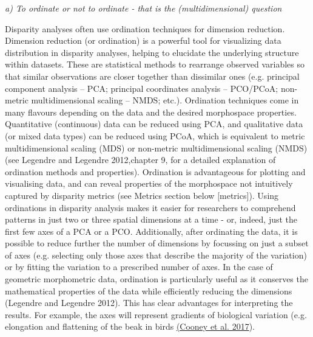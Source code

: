 \documentclass[12pt,letterpaper]{article}
\renewcommand{\subsection}[1]{%
\bigskip
\begin{center}
\begin{large}
\normalfont\itshape #1
\end{large}
\end{center}}
\begin{document}
\subsection{a) To ordinate or not to ordinate - that is the (multidimensional) question}

Disparity analyses often use ordination techniques for dimension reduction.
Dimension reduction (or ordination) is a powerful tool for visualizing data distribution in disparity analyses, helping to elucidate the underlying structure within datasets.
These are statistical methods to rearrange observed variables so that similar observations are closer together than dissimilar ones (e.g. principal component analysis -- PCA; principal coordinates analysis -- PCO/PCoA; non-metric multidimensional scaling -- NMDS; etc.).
Ordination techniques come in many flavours depending on the data and the desired morphospace properties.
Quantitative (continuous) data can be reduced using PCA, and qualitative data (or mixed data types) can be reduced using PCoA, which is equivalent to metric multidimensional scaling (MDS) or non-metric multidimensional scaling (NMDS) (see Legendre and Legendre 2012,chapter 9, for a detailed explanation of ordination methods and properties).
Ordination is advantageous for plotting and visualising data, and can reveal properties of the morphospace not intuitively captured by disparity metrics (see Metrics section below {[}metrics{]}).
Using ordinations in disparity analysis makes it easier for researchers to comprehend patterns in just two or three spatial dimensions at a time - or, indeed, just the first few axes of a PCA or a PCO.
Additionally, after ordinating the data, it is possible to reduce further the number of dimensions by focussing on just a subset of axes (e.g. selecting only those axes that describe the majority of the variation) or by fitting the variation to a prescribed number of axes.
In the case of geometric morphometric data, ordination is particularly useful as it conserves the mathematical properties of the data while efficiently reducing the dimensions (Legendre and Legendre 2012). %
This has clear advantages for interpreting the results.
For example, the axes will represent gradients of biological variation (e.g. elongation and flattening of the beak in birds \href{https://paperpile.com/c/sTGYvp/RjqE}{(Cooney et al. 2017}).
\end{document}
